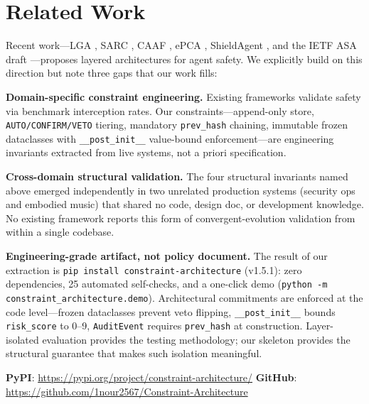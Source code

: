 \documentclass[letterpaper]{article} %
\begin{document}
\section{Related Work}

Recent work---LGA \cite{ge2026}, SARC \cite{besanson2026}, CAAF \cite{li2026},
ePCA \cite{yang2026}, ShieldAgent \cite{zhao2025}, and the IETF ASA
draft \cite{baysal2026}---proposes layered architectures for agent safety.
We explicitly build on this direction but note three gaps that our work fills:

\textbf{Domain-specific constraint engineering.}
Existing frameworks validate safety via benchmark interception rates.
Our constraints---append-only store, \texttt{AUTO/CONFIRM/VETO} tiering,
mandatory \texttt{prev\_hash} chaining, immutable frozen dataclasses with
\texttt{\_\_post\_init\_\_} value-bound enforcement---are engineering
invariants extracted from live systems, not a priori specification.

\textbf{Cross-domain structural validation.}
The four structural invariants named above emerged independently in two
unrelated production systems (security ops and embodied music) that shared
no code, design doc, or development knowledge.  No existing framework reports
this form of convergent-evolution validation from within a single codebase.

\textbf{Engineering-grade artifact, not policy document.}
The result of our extraction is \texttt{pip install constraint-architecture}
(v1.5.1): zero dependencies, 25 automated self-checks, and a one-click demo
(\texttt{python -m constraint\_architecture.demo}).  Architectural commitments
are enforced at the code level---frozen dataclasses prevent veto flipping,
\texttt{\_\_post\_init\_\_} bounds \texttt{risk\_score} to 0--9,
\texttt{AuditEvent} requires \texttt{prev\_hash} at construction.
Layer-isolated evaluation \cite{hu2026} provides the testing methodology;
our skeleton provides the structural guarantee that makes such isolation
meaningful.

\bigskip
\noindent\textbf{PyPI}: \url{https://pypi.org/project/constraint-architecture/}
\quad
\textbf{GitHub}: \url{https://github.com/1nour2567/Constraint-Architecture}
\end{document}
